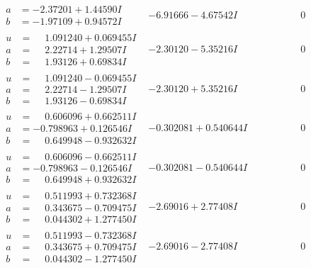 \documentclass[1p]{elsarticle_modified}
\theoremstyle{definition}
\begin{document}
$$\begin{array}{c|c|c}
\begin{aligned}
a &= -2.37201 + 1.44590 I \\
b &= -1.97109 + 0.94572 I\end{aligned}
 & -6.91666 - 4.67542 I & \phantom{-0.000000 } 0 \\ \hline\begin{aligned}
u &= \phantom{-}1.091240 + 0.069455 I \\
a &= \phantom{-}2.22714 + 1.29507 I \\
b &= \phantom{-}1.93126 + 0.69834 I\end{aligned}
 & -2.30120 - 5.35216 I & \phantom{-0.000000 } 0 \\ \hline\begin{aligned}
u &= \phantom{-}1.091240 - 0.069455 I \\
a &= \phantom{-}2.22714 - 1.29507 I \\
b &= \phantom{-}1.93126 - 0.69834 I\end{aligned}
 & -2.30120 + 5.35216 I & \phantom{-0.000000 } 0 \\ \hline\begin{aligned}
u &= \phantom{-}0.606096 + 0.662511 I \\
a &= -0.798963 + 0.126546 I \\
b &= \phantom{-}0.649948 - 0.932632 I\end{aligned}
 & -0.302081 + 0.540644 I & \phantom{-0.000000 } 0 \\ \hline\begin{aligned}
u &= \phantom{-}0.606096 - 0.662511 I \\
a &= -0.798963 - 0.126546 I \\
b &= \phantom{-}0.649948 + 0.932632 I\end{aligned}
 & -0.302081 - 0.540644 I & \phantom{-0.000000 } 0 \\ \hline\begin{aligned}
u &= \phantom{-}0.511993 + 0.732368 I \\
a &= \phantom{-}0.343675 - 0.709475 I \\
b &= \phantom{-}0.044302 + 1.277450 I\end{aligned}
 & -2.69016 + 2.77408 I & \phantom{-0.000000 } 0 \\ \hline\begin{aligned}
u &= \phantom{-}0.511993 - 0.732368 I \\
a &= \phantom{-}0.343675 + 0.709475 I \\
b &= \phantom{-}0.044302 - 1.277450 I\end{aligned}
 & -2.69016 - 2.77408 I & \phantom{-0.000000 } 0 \\ \hline\begin{aligned}

\end{aligned}
\end{array}$$
\end{document}
